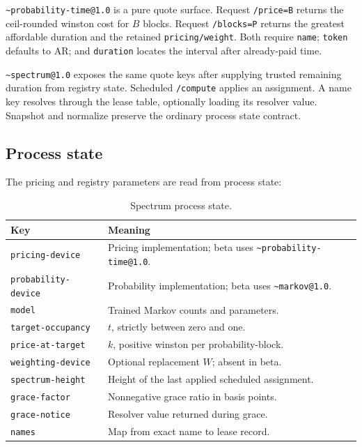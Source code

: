 \documentclass[10pt,twocolumn]{article}
\newcommand{\device}[1]{\texttt{\textasciitilde#1}}
\newcommand{\key}[1]{\texttt{#1}}
\begin{document}
\device{probability-time@1.0} is a pure quote surface. Request
\key{/price=B} returns the ceil-rounded winston cost for $B$ blocks. Request
\key{/blocks=P} returns the greatest affordable duration and the retained
\key{pricing/weight}. Both require \key{name}; \key{token} defaults to AR; and
\key{duration} locates the interval after already-paid time.

\device{spectrum@1.0} exposes the same quote keys after supplying trusted
remaining duration from registry state. Scheduled \key{/compute} applies an
assignment. A name key resolves through the lease table, optionally loading its
resolver value. Snapshot and normalize preserve the ordinary process state
contract.

\subsection{Process state}

The pricing and registry parameters are read from process state:

\begin{table}[t]
\centering
\caption{Spectrum process state.}
\begin{tabularx}{\textwidth}{@{}p{}X@{}}
\toprule
Key & Meaning \\
\midrule
\key{pricing-device} & Pricing implementation; beta uses
\device{probability-time@1.0}. \\
\key{probability-device} & Probability implementation; beta uses
\device{markov@1.0}. \\
\key{model} & Trained Markov counts and parameters. \\
\key{target-occupancy} & $t$, strictly between zero and one. \\
\key{price-at-target} & $k$, positive winston per probability-block. \\
\key{weighting-device} & Optional replacement $W$; absent in beta. \\
\key{spectrum-height} & Height of the last applied scheduled assignment. \\
\key{grace-factor} & Nonnegative grace ratio in basis points. \\
\key{grace-notice} & Resolver value returned during grace. \\
\key{names} & Map from exact name to lease record. \\
\bottomrule
\end{tabularx}
\end{table}
\end{document}
